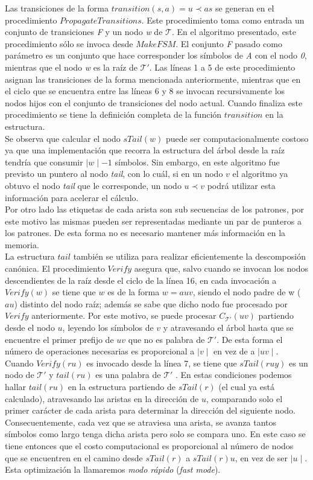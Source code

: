 Las transiciones de la forma $transition(s,a)= u \prec as$ se generan en el procedimiento $PropagateTransitions$. Este procedimiento toma como entrada un conjunto de transiciones {\it F} y un nodo {\it w} de $\mathcal{T}$. En el algoritmo presentado, este procedimiento sólo se invoca desde $MakeFSM$. El conjunto {\it F} pasado como parámetro es un conjunto que hace corresponder los símbolos de {\it A} con el nodo {\it 0}, mientras que el nodo {\it w} es la raíz de $\mathcal{T}'$. Las líneas 1 a 5 de este procedimiento asignan las transiciones de la forma mencionada anteriormente, mientras que en el ciclo que se encuentra entre las líneas 6 y 8 se invocan recursivamente los nodos hijos con el conjunto de transiciones del nodo actual. Cuando finaliza este procedimiento se tiene la definición completa de la función $transition$ en la estructura.\\
Se observa que calcular el nodo $sTail(w)$ puede ser computacionalmente costoso ya que una implementación que recorra la estructura del árbol desde la raíz tendría que consumir $\mid w \mid - 1$  símbolos. Sin embargo, en este algoritmo fue previsto un puntero al nodo {\it tail}, con lo cuál, si en un nodo $v$ el algoritmo ya obtuvo el nodo {\it tail} que le corresponde, un nodo $u \prec v$ podrá utilizar esta información para acelerar el cálculo.\\ 
Por otro lado las etiquetas de cada arista son sub secuencias de los patrones, por este motivo las mismas pueden ser representadas mediante un par de punteros a los patrones. De esta forma no es necesario mantener más información en la memoria.\\ 
La estructura $tail$ también se utiliza para realizar eficientemente la descomposión canónica. El procedimiento $Verify$ asegura que, salvo cuando se invocan los nodos descendientes de la raíz desde el ciclo de la línea 16, en cada invocación a $Verify(w)$ se tiene que $w$ es de la forma $w=auv$, siendo el nodo padre de w ($au$) distinto del nodo raíz; además se sabe que dicho nodo fue procesado por $Verify$ anteriormente. Por este motivo, se puede procesar $C_{\mathcal{T}'}(uv)$ partiendo desde el nodo $u$, leyendo los símbolos de $v$ y atravesando el árbol hasta que se encuentre el primer prefijo de $uv$ que no es palabra de $\mathcal{T}'$. De esta forma el número de operaciones necesarias es proporcional a $\mid v \mid$ en vez de a $\mid uv \mid$.\\ 
Cuando $Verify(ru)$ es invocado desde la línea 7, se tiene que $sTail(ruy)$ es un nodo de $\mathcal{T}'$ y $tail(ru)$ es una palabra de $\mathcal{T}'$ . En estas condiciones podemos hallar $tail(ru)$ en la estructura partiendo de $sTail(r)$ (el cual ya está calculado), atravesando las aristas en la dirección de $u$, comparando solo el primer carácter de cada arista para determinar la dirección del siguiente nodo. Consecuentemente, cada vez que se atraviesa una arista, se avanza tantos símbolos como largo tenga dicha arista pero solo se compara uno. En este caso se tiene entonces que el costo computacional es proporcional al número de nodos que se encuentren en el camino desde $sTail(r)$ a $sTail(r)u$, en vez de ser $\mid u \mid$. Esta optimización la llamaremos \emph{modo rápido} ({\it fast mode}).

